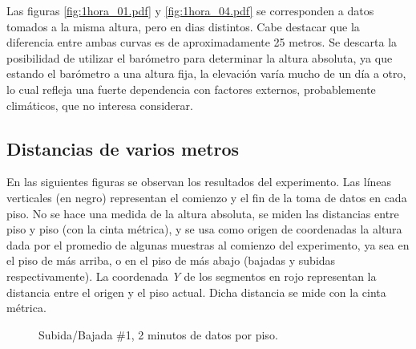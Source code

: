 \documentclass[main]{subfiles}
\begin{document}
Las figuras \ref{fig:1hora_01.pdf} y \ref{fig:1hora_04.pdf} se corresponden a datos tomados a la misma altura, pero en dias distintos. Cabe destacar que la diferencia entre ambas curvas es de aproximadamente 25 metros. Se descarta la posibilidad de utilizar el bar\'ometro para determinar la altura absoluta, ya que estando el bar\'ometro a una altura fija, la elevaci\'on var\'ia mucho de un d\'ia a otro, lo cual refleja una fuerte dependencia con factores externos, probablemente clim\'aticos, que no interesa considerar.

\subsection{Distancias de varios metros}

En las siguientes figuras se observan los resultados del experimento. Las l\'ineas verticales (en negro) representan el comienzo y el fin de la toma de datos en cada piso. No se hace una medida de la altura absoluta, se miden las distancias entre piso y piso (con la cinta m\'etrica), y se usa como origen de coordenadas la altura dada por el promedio de algunas muestras al comienzo del experimento, ya sea en el piso de m\'as arriba, o en el piso de m\'as abajo (bajadas y subidas respectivamente). La coordenada \textit{Y} de los segmentos en rojo representan la distancia entre el origen y el piso actual. Dicha distancia se mide con la cinta m\'etrica.

\begin{figure}[h!]
\centering
{}
\caption{Subida/Bajada \#1, 2 minutos de datos por piso.}
\label{fig:subida-bajada-1-2}
\end{figure}
\end{document}
